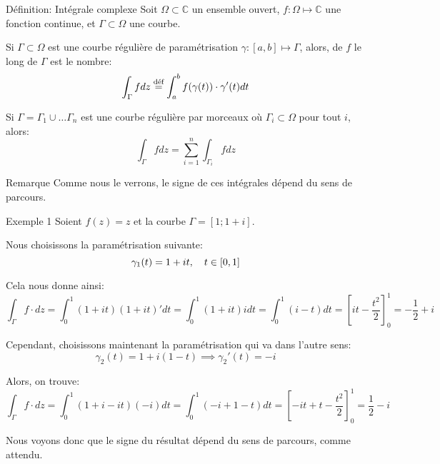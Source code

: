 \documentclass[a4paper]{article}
\begin{document}
\begin{parag}{Définition: Intégrale complexe}
    Soit $\Omega \subset \mathbb{C}$ un ensemble ouvert, $f: \Omega \mapsto \mathbb{C}$ une fonction continue, et $\Gamma \subset \Omega$ une courbe.

    Si $\Gamma \subset \Omega$ est une courbe régulière de paramétrisation $\gamma : \left[a, b\right] \mapsto \Gamma$, alors,  de $f$ le long de $\Gamma$ est le nombre: 
    \[\int_{\Gamma} f dz \over{=}{déf} \int_{a}^{b} f\left(\gamma\left(t\right)\right) \cdot \gamma'\left(t\right)dt\]
    
    Si $\Gamma = \Gamma_1 \cup \ldots \Gamma_n$ est une courbe régulière par morceaux où $\Gamma_i \subset \Omega$ pour tout $i$, alors: 
    \[\int_{\Gamma} f dz = \sum_{i=1}^{n} \int_{\Gamma_i} f dz\]

    \begin{subparag}{Remarque}
        Comme nous le verrons, le signe de ces intégrales dépend du sens de parcours.
    \end{subparag}
\end{parag}

\begin{parag}{Exemple 1}
    Soient $f\left(z\right) = z$ et la courbe $\Gamma = \left[1; 1 + i\right]$. 

    Nous choisissons la paramétrisation suivante: 
    \[\gamma_1\left(t\right) = 1 + it, \mathspace t \in \left[0, 1\right]\]

    Cela nous donne ainsi: 
    \[\int_{\Gamma} f \cdot dz = \int_{0}^{1} \left(1 + it\right)\left(1 + it\right)' dt = \int_{0}^{1} \left(1 + it\right)i dt = \int_{0}^{1} \left(i - t\right)dt = \left[it - \frac{t^2}{2}\right]_{0}^{1} = -\frac{1}{2} + i\]
    

    Cependant, choisissons maintenant la paramétrisation qui va dans l'autre sens: 
    \[\gamma_2\left(t\right) = 1 + i\left(1 -t\right) \implies \gamma_2'\left(t\right) = -i\]
    
    Alors, on trouve: 
    \[\int_{\Gamma} f \cdot dz = \int_{0}^{1} \left(1 + i - it\right) \left(-i\right)dt = \int_{0}^{1} \left(-i + 1 -t\right)dt = \left[-it + t - \frac{t^2}{2}\right]_0^1 = \frac{1}{2} - i\]

    Nous voyons donc que le signe du résultat dépend du sens de parcours, comme attendu.
\end{parag}
\end{document}
